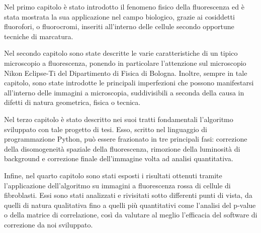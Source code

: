 Nel primo capitolo è stato introdotto il fenomeno fisico della fluorescenza ed è stata mostrata la sua applicazione nel campo biologico, grazie ai cosiddetti fluorofori, o fluorocromi, inseriti all'interno delle cellule secondo opportune tecniche di marcatura.

Nel secondo capitolo sono state descritte le varie caratteristiche di un tipico microscopio a fluorescenza, ponendo in particolare l'attenzione sul microscopio Nikon Eclipse-Ti del Dipartimento di Fisica di Bologna. 
Inoltre, sempre in tale capitolo, sono state introdotte le principali imperfezioni che possono manifestarsi all'interno delle immagini a microscopia, suddivisibili a seconda della causa in difetti di natura geometrica, fisica o tecnica.

Nel terzo capitolo è stato descritto nei suoi tratti fondamentali l'algoritmo sviluppato con tale progetto di tesi. 
Esso, scritto nel linguaggio di programmazione Python, può essere frazionato in tre principali fasi: correzione della disomogeneità spaziale della fluorescenza, rimozione della luminosità di background e correzione finale dell'immagine volta ad analisi quantitativa.

Infine, nel quarto capitolo sono stati esposti i risultati ottenuti tramite l'applicazione dell'algoritmo su immagini a fluorescenza rossa di cellule di fibroblasti.
Essi sono stati analizzati e rivisitati sotto differenti punti di vista, da quelli di natura qualitativa fino a quelli più quantitativi come l'analisi del p-value o della matrice di correlazione, così da valutare al meglio l'efficacia del software di correzione da noi sviluppato.